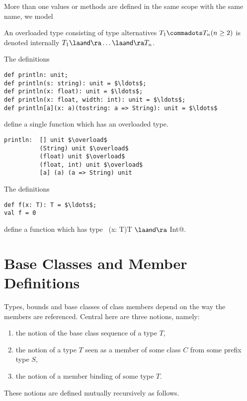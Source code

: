 \documentclass[a4paper,12pt,twoside,titlepage]{book}
\begin{document}
More than one values or methods are defined in the same scope with the
same name, we model

An overloaded type consisting of type alternatives $T_1 \commadots
T_n (n \geq 2)$ is denoted internally $T_1 \overload \ldots \overload T_n$.

\example The definitions
\begin{lstlisting}
def println: unit;
def println(s: string): unit = $\ldots$;
def println(x: float): unit = $\ldots$;
def println(x: float, width: int): unit = $\ldots$;
def println[a](x: a)(tostring: a => String): unit = $\ldots$
\end{lstlisting}
define a single function  which has an overloaded
type.
\begin{lstlisting}
println:  [] unit $\overload$
          (String) unit $\overload$
          (float) unit $\overload$
          (float, int) unit $\overload$
          [a] (a) (a => String) unit
\end{lstlisting}

\example The definitions
\begin{lstlisting}
def f(x: T): T = $\ldots$;
val f = 0
\end{lstlisting}
define a function  which has type ~\lstinline@(x: T)T $\overload$ Int@.

\section{Base Classes and Member Definitions}
\label{sec:base-classes}

Types, bounds and base classes of class members depend on the way the
members are referenced.  Central here are three notions, namely:
\begin{enumerate}
\item the notion of the base class sequence of a type $T$,
\item the notion of a type $T$ seen as a member of some class $C$ from some 
      prefix type $S$,
\item the notion of a member binding of some type $T$.
\end{enumerate}
These notions are defined mutually recursively as follows.
\end{document}
